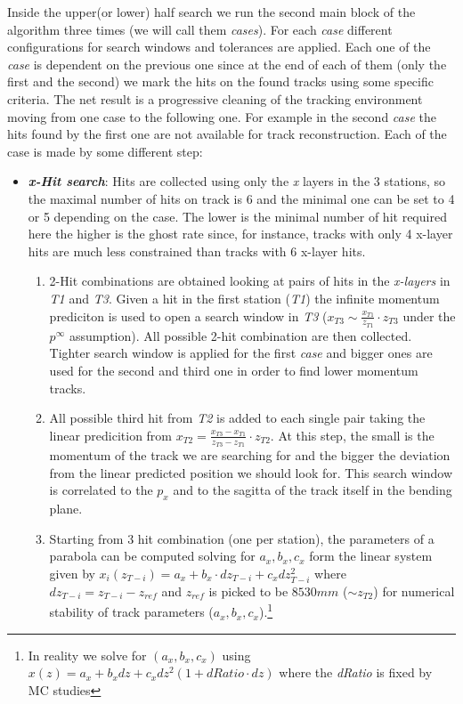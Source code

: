 \documentclass[paper=a4, fontsize=10pt]{scrartcl}
\numberwithin{equation}{section}		%
\numberwithin{figure}{section}			%
\numberwithin{table}{section}				%
\begin{document}
Inside the upper(or lower) half search we run the second main block of the algorithm three times (we will call them \textit{cases}). For each \textit{case} different configurations for search windows and tolerances are applied. Each one of the \textit{case} is dependent on the previous one since at the end of each of them (only the first and the second) we mark the hits on the found tracks using some specific criteria. The net result is a progressive cleaning of the tracking environment moving from one case to the following one. For example in the second \textit{case} the hits found by the first one are not available for track reconstruction.
Each of the case is made by some different step:
\begin{itemize}
  \item{\textbf{\textit{x-Hit search}}: Hits are collected using only the \textit{x} layers in the 3 stations, so the maximal number of hits on track is 6 and the minimal one can be set to 4 or 5 depending on the case. The lower is the minimal number of hit required here the higher is the ghost rate since, for instance, tracks with only 4 x-layer hits are much less constrained than tracks with 6 x-layer hits.}
    \begin{enumerate}
    \item{2-Hit combinations are obtained looking at pairs of hits in the \textit{x-layers} in \textit{T1} and \textit{T3}. Given a hit in the first station (\textit{T1}) the infinite momentum prediciton is used to open a search window in \textit{T3} ($x_{T3} \sim \frac{x_{T1}}{z_{T1}}\cdot z_{T3}$ under the $p^{ \infty }$ assumption). All possible 2-hit combination are then collected. Tighter search window is applied for the first \textit{case} and bigger ones are used for the second and third one in order to find lower momentum tracks.}
      \item{All possible third hit from \textit{T2} is added to each single pair taking the linear predicition from $x_{T2} = \frac{x_{T3}-x_{T1}}{z_{T3}-z_{T1}}\cdot z_{T2}$. At this step, the small is the momentum of the track we are searching for and the bigger the deviation from the linear predicted position we should look for. This search window is correlated to the $p_{x}$ and to the sagitta of the track itself in the bending plane.}
      \item{Starting from 3 hit combination (one per station), the parameters of a parabola can be computed solving for $a_{x},b_x,c_x$ form the linear system given by $x_{i}(z_{T-i})= a_{x}+b_{x}\cdot dz_{T-i}+c_{x}dz_{T-i}^{2}$ where $dz_{T-i} = z_{T-i}-z_{ref}$ and $z_{ref}$ is picked to be $8530 mm$ ($\sim z_{T2}$) for numerical stability of track parameters ($a_{x},b_{x},c_{x}$).\footnote{In reality we solve for $(a_{x},b_{x},c_{x})$ using $x(z)=a_{x}+b_{x}dz+c_{x}dz^{2}(1+dRatio\cdot dz)$ where the \textit{dRatio} is fixed by MC studies}}

\end{enumerate}
\end{itemize}
\end{document}
